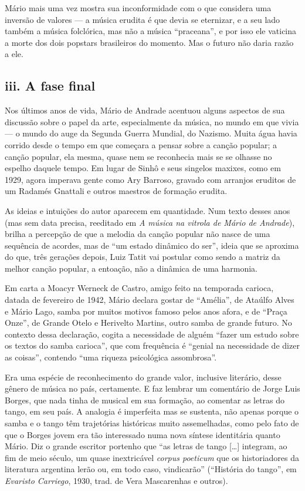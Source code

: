 Mário mais uma vez mostra sua inconformidade com o que considera uma
inversão de valores --- a música erudita é que devia se eternizar, e a
seu lado também a música folclórica, mas não a música ``praceana'', e
por isso ele vaticina a morte dos dois popstars brasileiros do momento.
Mas o futuro não daria razão a ele.

\subsection{iii. A fase final}

Nos últimos anos de vida, Mário de Andrade acentuou alguns aspectos de
sua discussão sobre o papel da arte, especialmente da música, no mundo
em que vivia --- o mundo do auge da Segunda Guerra Mundial, do Nazismo.
Muita água havia corrido desde o tempo em que começara a pensar sobre a
canção popular; a canção popular, ela mesma, quase nem se reconhecia
mais se se olhasse no espelho daquele tempo. Em lugar de Sinhô e seus
singelos maxixes, como em 1929, agora imperava gente como Ary Barroso,
gravado com arranjos eruditos de um Radamés Gnattali e outros maestros
de formação erudita.

As ideias e intuições do autor aparecem em quantidade. Num texto desses
anos (mas sem data precisa, reeditado em \emph{A música na vitrola de
Mário de Andrade}), brilha a percepção de que a melodia da canção
popular não nasce de uma sequência de acordes, mas de ``um estado
dinâmico do ser'', ideia que se aproxima do que, três gerações depois,
Luiz Tatit vai postular como sendo a matriz da melhor canção popular, a
entoação, não a dinâmica de uma harmonia.

Em carta a Moacyr Werneck de Castro, amigo feito na temporada carioca,
datada de fevereiro de 1942, Mário declara gostar de ``Amélia'', de
Ataúlfo Alves e Mário Lago, samba por muitos motivos famoso pelos anos
afora, e de ``Praça Onze'', de Grande Otelo e Herivelto Martins, outro
samba de grande futuro. No contexto dessa declaração, cogita a
necessidade de alguém ``fazer um estudo sobre os textos do samba
carioca'', que com frequência é ``genial na necessidade de dizer as
coisas'', contendo ``uma riqueza psicológica assombrosa''.

Era uma espécie de reconhecimento do grande valor, inclusive literário,
desse gênero de música no país, certamente. E faz lembrar um comentário
de Jorge Luis Borges, que nada tinha de musical em sua formação, ao
comentar as letras do tango, em seu país. A analogia é imperfeita mas se
sustenta, não apenas porque o samba e o tango têm trajetórias históricas
muito assemelhadas, como pelo fato de que o Borges jovem era tão
interessado numa nova síntese identitária quanto Mário. Diz o grande
escritor portenho que ``as letras de tango {[}\ldots{}{]} integram, ao fim de
meio século, um quase inextricável \emph{corpus poeticum} que os
historiadores da literatura argentina lerão ou, em todo caso,
vindicarão'' (``História do tango'', em \emph{Evaristo Carriego}, 1930,
trad. de Vera Mascarenhas e outros).

